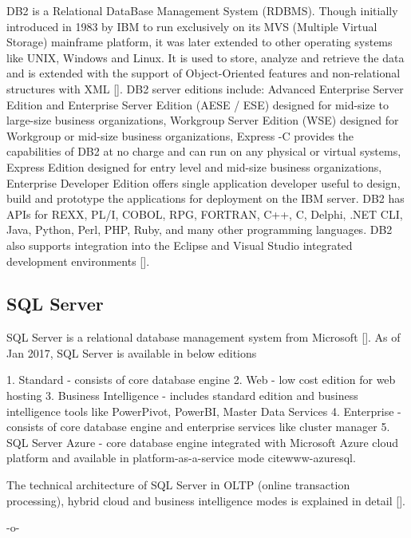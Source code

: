 DB2 is a Relational DataBase Management System (RDBMS). Though
initially introduced in 1983 by IBM to run exclusively on its MVS
(Multiple Virtual Storage) mainframe platform, it was later extended
to other operating systems like UNIX, Windows and Linux. It is used to
store, analyze and retrieve the data and is extended with the support
of Object-Oriented features and non-relational structures with
XML [\cite{www-DB2Intro}]. DB2 server editions include: Advanced
Enterprise Server Edition and Enterprise Server Edition (AESE / ESE)
designed for mid-size to large-size business organizations, Workgroup
Server Edition (WSE) designed for Workgroup or mid-size business
organizations, Express -C provides the capabilities of DB2 at no
charge and can run on any physical or virtual systems, Express Edition
designed for entry level and mid-size business organizations,
Enterprise Developer Edition offers single application developer
useful to design, build and prototype the applications for deployment
on the IBM server. DB2 has APIs for REXX, PL/I, COBOL, RPG, FORTRAN,
C++, C, Delphi, .NET CLI, Java, Python, Perl, PHP, Ruby, and many
other programming languages. DB2 also supports integration into the
Eclipse and Visual Studio integrated development
environments [\cite{www-DB2Wiki}].

\subsection{SQL Server}

SQL Server is a relational database management system from
Microsoft [\cite{www-sqlserver-wiki}].  As of Jan 2017, SQL Server is
available in below editions

     1. Standard - consists of core database engine
     2. Web - low cost edition for web hosting
     3. Business Intelligence - includes standard edition and business
        intelligence tools like PowerPivot, PowerBI, Master Data Services
     4. Enterprise - consists of core database engine and enterprise services
        like cluster manager
     5. SQL Server Azure - core database engine
        integrated with Microsoft Azure cloud platform and available in
        platform-as-a-service mode cite{www-azuresql}.

        The technical architecture of SQL Server in OLTP (online
        transaction processing), hybrid cloud and business
        intelligence modes is explained in
        detail [\cite{book-sqlserver}].

     -o-



